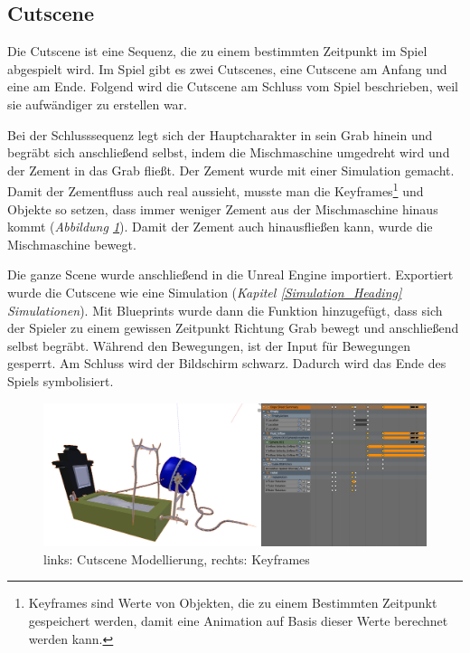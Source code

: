 \subsection{Cutscene}

Die Cutscene ist eine Sequenz, die zu einem bestimmten Zeitpunkt im Spiel abgespielt wird.
Im Spiel gibt es zwei Cutscenes, eine Cutscene am Anfang und eine am Ende. Folgend wird die Cutscene
am Schluss vom Spiel beschrieben, weil sie aufwändiger zu erstellen war.

Bei der Schlusssequenz legt sich der Hauptcharakter in sein Grab hinein und begräbt sich anschließend selbst, indem
die Mischmaschine umgedreht wird und der Zement in das Grab fließt. Der Zement wurde mit einer Simulation gemacht.
Damit der Zementfluss auch real aussieht, musste man die Keyframes\footnote{Keyframes sind Werte von Objekten, die zu einem Bestimmten Zeitpunkt gespeichert werden, damit eine Animation auf Basis dieser Werte berechnet werden kann.}
und Objekte so setzen, dass immer weniger Zement aus der Mischmaschine hinaus kommt (\textit{Abbildung \ref{cutscene:image_modellierung}}). Damit der Zement auch hinausfließen kann, wurde die Mischmaschine bewegt.

Die ganze Scene wurde anschließend in die Unreal Engine importiert. Exportiert wurde die Cutscene wie eine Simulation (\textit{Kapitel \ref{Simulation_Heading} \dq Simulationen\dq}).
Mit Blueprints wurde dann die Funktion hinzugefügt, dass sich der
Spieler zu einem gewissen Zeitpunkt Richtung Grab bewegt und anschließend selbst begräbt. Während den Bewegungen, ist der Input für Bewegungen gesperrt.
Am Schluss wird der Bildschirm schwarz. Dadurch wird das Ende des Spiels symbolisiert.

\begin{figure}[h]
    \centering
    \includegraphics[width=.8\textwidth]{images/Cutscene_Modellierung.png}
    \caption{links: Cutscene Modellierung, rechts: Keyframes}
    \label{cutscene:image_modellierung}
\end{figure}